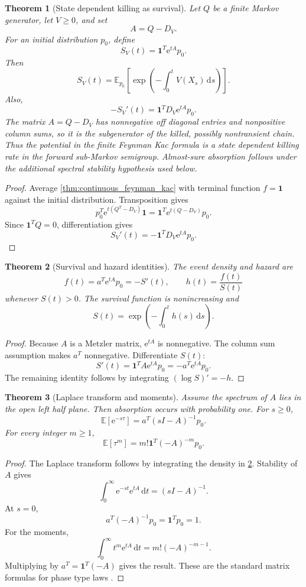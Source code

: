 \documentclass{aomart}
\newtheorem{theorem}{Theorem}[section]
\theoremstyle{definition}
\theoremstyle{remark}
\newcommand{\Exp}{\mathbb E}
\newcommand{\e}{\mathrm e}
\newcommand{\one}{\bm 1}
\newcommand{\dd}{\,\mathrm d}
\begin{document}
\begin{theorem}[State dependent killing as survival]\label{thm:killing_survival}
Let \(Q\) be a finite Markov generator, let \(V\geq0\), and set
\[
A=Q-D_V.
\]
For an initial distribution \(p_0\), define
\[
S_V(t)=\one^T\e^{tA}p_0.
\]
Then
\[
S_V(t)
=
\Exp_{p_0}
\left[
\exp\left(
-\int_0^tV(X_s)\dd s
\right)
\right].
\]
Also,
\[
-S_V'(t)
=
\one^TD_V\e^{tA}p_0.
\]
The matrix \(A=Q-D_V\) has nonnegative off diagonal entries and nonpositive column sums, so it is the subgenerator of the killed, possibly nontransient chain. Thus the potential in the finite Feynman Kac formula is a state dependent killing rate in the forward sub-Markov semigroup. Almost-sure absorption follows under the additional spectral stability hypothesis used below.
\end{theorem}

\begin{proof}
Average \cref{thm:continuous_feynman_kac} with terminal function \(f=\one\) against the initial distribution. Transposition gives
\[
p_0^T\e^{t(Q^T-D_V)}\one
=
\one^T\e^{t(Q-D_V)}p_0.
\]
Since \(\one^TQ=0\), differentiation gives
\[
S_V'(t)
=
-\one^TD_V\e^{tA}p_0.
\]
\end{proof}

\begin{theorem}[Survival and hazard identities]\label{thm:survival_hazard}
The event density and hazard are
\[
f(t)=a^T\e^{tA}p_0=-S'(t),
\qquad
h(t)=\frac{f(t)}{S(t)}
\]
whenever \(S(t)>0\). The survival function is nonincreasing and
\[
S(t)
=
\exp\left(
-\int_0^th(s)\dd s
\right).
\]
\end{theorem}

\begin{proof}
Because \(A\) is a Metzler matrix, \(\e^{tA}\) is nonnegative. The column sum assumption makes \(a^T\) nonnegative. Differentiate \(S(t)\):
\[
S'(t)=\one^TA\e^{tA}p_0=-a^T\e^{tA}p_0.
\]
The remaining identity follows by integrating \((\log S)'=-h\).
\end{proof}

\begin{theorem}[Laplace transform and moments]\label{thm:survival_moments}
Assume the spectrum of \(A\) lies in the open left half plane. Then absorption occurs with probability one. For \(s\geq0\),
\[
\Exp[\e^{-s\tau}]
=
a^T(sI-A)^{-1}p_0.
\] For every integer \(m\geq1\),
\[
\Exp[\tau^m]
=
m!\one^T(-A)^{-m}p_0.
\]
\end{theorem}

\begin{proof}
The Laplace transform follows by integrating the density in \cref{thm:survival_hazard}. Stability of \(A\) gives
\[
\int_0^\infty
\e^{-st}\e^{tA}\dd t
=
(sI-A)^{-1}.
\]
At \(s=0\),
\[
a^T(-A)^{-1}p_0
=
\one^Tp_0=1.
\]
For the moments,
\[
\int_0^\infty t^m\e^{tA}\dd t
=
m!(-A)^{-m-1}.
\]
Multiplying by \(a^T=\one^T(-A)\) gives the result. These are the standard matrix formulas for phase type laws \cite{Neuts1981,AsmussenNermanOlsson1996}.
\end{proof}
\end{document}
